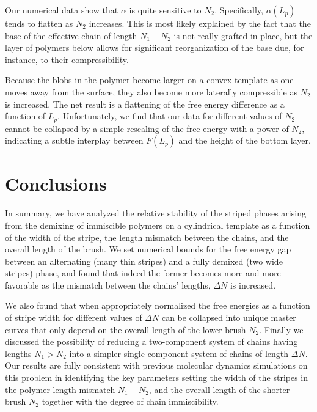 Our numerical data show that $\alpha$ is quite sensitive to $N_2$. Specifically,  
$\alpha(L_p)$ tends to flatten as $N_2$ increases. 
This is most likely explained by the fact that the base of the effective chain of length $N_1-N_2$
is not really grafted in place, but the layer of polymers below allows for significant reorganization of the base
due, for instance, to their compressibility. 

Because the blobs in the polymer become larger on a convex template as one moves away from the surface, they also become more laterally compressible
as $N_2$ is increased. 
The net result is a flattening of the free energy difference as a function of $L_p$.
Unfortunately, we find that our data for different values of $N_2$
cannot be collapsed by a simple rescaling of the free energy with a power of $N_2$,
indicating a subtle interplay between $F(L_p)$ and the height of the bottom layer.

\section{Conclusions}

In summary, we have analyzed the relative stability of the striped phases  arising from the demixing of immiscible polymers 
on a cylindrical template as a function of the width of the stripe, the length mismatch between the chains, and the overall length of the brush. We set numerical bounds for the free energy gap between an alternating (many thin stripes) and a fully demixed (two wide stripes) phase, and found that indeed the former
becomes more and more favorable as the mismatch between the chains' lengths, $\Delta N$ is increased.

We also found that when appropriately normalized the free energies as a function of stripe width for different values of $\Delta N$  can be collapsed into unique master curves that only depend on the overall length of the lower brush $N_2$. Finally we discussed the possibility of reducing a two-component system of chains 
having lengths $N_1>N_2$ into a simpler single component system of chains of length $\Delta N$.
Our results are fully consistent with previous molecular dynamics simulations on this problem
{ in identifying the key parameters setting the width of the stripes in the polymer length mismatch $N_1-N_2$, 
and the overall length of the shorter brush $N_2$ together with the degree of chain immiscibility}. 

